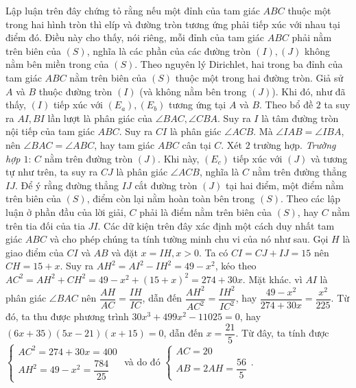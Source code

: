 \begin{multicols}{2}
\vskip 0.1cm
Lập luận trên đây chứng tỏ rằng nếu một đỉnh của tam giác $ABC$ thuộc một trong hai hình tròn thì elíp và đường tròn tương ứng phải tiếp xúc với nhau tại điểm đó. Điều này cho thấy, nói riêng, mỗi đỉnh của tam giác $ABC$ phải nằm trên biên của $(S)$, nghĩa là các phần của các đường tròn $(I), (J)$ không nằm bên miền trong của $(S)$.
\vskip 0.1cm
Theo nguyên lý Dirichlet, hai trong ba đỉnh của tam giác $ABC$ nằm trên biên của $(S)$ thuộc một trong hai đường tròn. Giả sử $A$ và $B$ thuộc đường tròn $(I)$ (và không nằm bên trong $(J)$). Khi đó, như đã thấy, $(I)$ tiếp xúc với $(E_a),(E_b)$ tương ứng tại $A$ và $B$.
\vskip 0.1cm
Theo bổ đề $2$ ta suy ra $AI,BI$ lần lượt là phân giác của $\angle{BAC},\angle{CBA}$. Suy ra $I$ là tâm đường tròn nội tiếp của tam giác $ABC$. Suy ra $CI$ là phân giác $\angle{ACB}$. Mà $\angle IAB= \angle IBA$, nên $\angle BAC = \angle ABC$, hay tam giác $ABC$ cân tại $C$.
\vskip 0.1cm
Xét $2$ trường hợp.
\vskip 0.1cm
\textit{Trường hợp $1$}: $C$ nằm trên đường tròn $(J)$. Khi này, $(E_c)$ tiếp xúc với $(J)$ và tương tự như trên, ta suy ra $CJ$ là phân giác $\angle{ACB}$, nghĩa là $C$ nằm trên đường thẳng $IJ$. Để ý rằng đường thẳng $IJ$ cắt đường tròn $(J)$ tại hai điểm, một điểm nằm trên biên của $(S)$, điểm còn lại nằm hoàn toàn bên trong $(S)$. Theo các lập luận ở phần đầu của lời giải, $C$ phải là điểm nằm trên biên của $(S)$, hay $C$ nằm trên tia đối của tia $JI$. Các dữ kiện trên đây xác định một cách duy nhất tam giác $ABC$ và cho phép chúng ta tính tường minh chu vi của nó như sau.
\vskip 0.1cm
Gọi $H$ là giao điểm của $CI$ và $AB$ và đặt  $x = IH, x > 0$. Ta có $CI = CJ + IJ = 15$ nên $CH = 15 + x$. Suy ra 
\vskip 0.1cm
$ AH^2 = AI^2 - IH^2 = 49 - x^2$, kéo theo $AC^2 = AH^2 + CH^2 = 49 - x^2 + (15 + x)^2 = 274 + 30x$.
\vskip 0.1cm
Mặt khác. vì $AI$ là phân giác $\angle{BAC}$ nên $\dfrac{AH}{AC} = \dfrac{IH}{IC}$, dẫn đến
\vskip 0.1cm
$ \dfrac{AH^2}{AC^2}=\dfrac{IH^2}{IC^2}$, hay $\dfrac{49 - x^2}{274 + 30x} = \dfrac{x^2}{225}$. Từ đó, ta thu được phương trình $ 30x^3 + 499x^2 - 11025=0$, hay $(6 x + 35) (5 x - 21) (x + 15)=0$, dẫn đến $x = \dfrac{21}{5}$.
\vskip 0.05cm
Từ đây, ta tính được $\begin{cases} \!\!\!AC^2 \!=\! 274 \!+\! 30x \!=\! 400 \\ \!\! AH^2 \!=\! 49 \!-\! x^2 \!=\! \dfrac{784}{25}    \end{cases}$ và do đó $\begin{cases} AC = 20 \\ AB = 2AH = \dfrac{56}{5}\end{cases}$.

\end{multicols}
